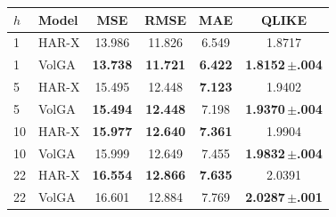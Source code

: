 \begin{tabular}{llcccc}
\toprule
$h$ & Model & MSE & RMSE & MAE & QLIKE \\
\midrule
1 & HAR-X & 13.986 & 11.826 & 6.549 & 1.8717 \\
1 & VolGA & \textbf{13.738} & \textbf{11.721} & \textbf{6.422} & \textbf{1.8152\,$\pm$.004} \\
\midrule
5 & HAR-X & 15.495 & 12.448 & \textbf{7.123} & 1.9402 \\
5 & VolGA & \textbf{15.494} & \textbf{12.448} & 7.198 & \textbf{1.9370\,$\pm$.004} \\
\midrule
10 & HAR-X & \textbf{15.977} & \textbf{12.640} & \textbf{7.361} & 1.9904 \\
10 & VolGA & 15.999 & 12.649 & 7.455 & \textbf{1.9832\,$\pm$.004} \\
\midrule
22 & HAR-X & \textbf{16.554} & \textbf{12.866} & \textbf{7.635} & 2.0391 \\
22 & VolGA & 16.601 & 12.884 & 7.769 & \textbf{2.0287\,$\pm$.001} \\
\bottomrule
\end{tabular}
